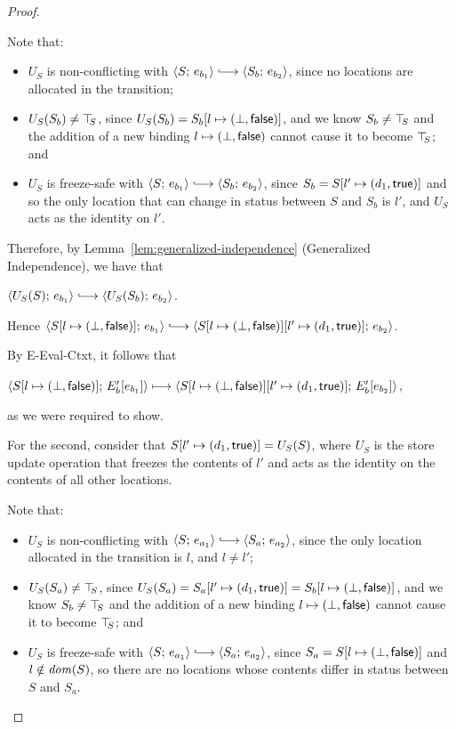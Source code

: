 \begin{proof}
\begin{enumerate}
\begin{enumerate}
      Note that:
      \begin{itemize}
      \item $U_S$ is non-conflicting with $\config{S}{e_{b_1}}
        \parstepsto \config{S_b}{e_{b_2}}$, since no locations are
        allocated in the transition;
      \item $U_S(S_b) \neq \top\hspace{-0.85mm}_{S}$, since $U_S(S_b) =
        S_b[l \mapsto (\bot, \textsf{false})]$, and we know $S_b \neq
        \top\hspace{-0.85mm}_{S}$ and the addition of a new binding
        $l \mapsto (\bot, \textsf{false})$ cannot cause it to
        become $\top\hspace{-0.85mm}_{S}$; and
      \item $U_S$ is freeze-safe with $\config{S}{e_{b_1}}
        \parstepsto \config{S_b}{e_{b_2}}$, since $S_b =
        S[l' \mapsto (d_1, \textsf{true})]$ and so the only location
        that can change in status between $S$ and $S_b$ is $l'$, and
        $U_S$ acts as the identity on $l'$.
      \end{itemize}
      Therefore, by Lemma~\ref{lem:generalized-independence}
      (Generalized Independence), we have that

      $\config{U_S(S)}{e_{b_1}} \parstepsto
      \config{U_S(S_b)}{e_{b_2}}$.

      Hence $\config{\extS{S}{l}{\bot}{\frozenfalse}}{e_{b_1}}
      \parstepsto
      \config{\extS{\extS{S}{l}{\bot}{\frozenfalse}}{l'}{d_1}{\frozentrue}}{e_{b_2}}$.

      By {\sc E-Eval-Ctxt}, it follows that

      $\langle S[l \mapsto (\bot, \textsf{false})];\, E'_b\hspace{-0.5mm}\left[e_{b_1}\right] \rangle
      \longmapsto
      \langle S[l \mapsto (\bot, \textsf{false})][l' \mapsto (d_1, \textsf{true})];\, E'_b\hspace{-0.5mm}\left[e_{b_2}\right] \rangle$,

      as we were required to show.

      For the second, consider that $S[l' \mapsto (d_1, \textsf{true})] =
      U_S(S)$, where $U_S$ is the store update operation that freezes
      the contents of $l'$ and acts as the identity on the contents of
      all other locations.

      Note that:
      \begin{itemize}
      \item $U_S$ is non-conflicting with $\config{S}{e_{a_1}}
        \parstepsto \config{S_a}{e_{a_2}}$, since the only location
        allocated in the transition is $l$, and $l \neq l'$;
      \item $U_S(S_a) \neq \top\hspace{-0.85mm}_{S}$, since $U_S(S_a) =
        S_a[l' \mapsto (d_1, \textsf{true})] =
        S_b[l \mapsto (\bot, \textsf{false})]$, and we know $S_b \neq
        \top\hspace{-0.85mm}_{S}$ and the addition of a new binding
        $l \mapsto (\bot, \textsf{false})$ cannot cause it to
        become $\top\hspace{-0.85mm}_{S}$; and
      \item $U_S$ is freeze-safe with $\config{S}{e_{a_1}}
        \parstepsto \config{S_a}{e_{a_2}}$, since $S_a =
        S[l \mapsto (\bot, \textsf{false})]$ and $l \notin \mathit{dom}(S)$, so
        there are no locations whose contents differ in status
        between $S$ and $S_a$.
      \end{itemize}


\end{enumerate}
\end{enumerate}
\end{proof}
